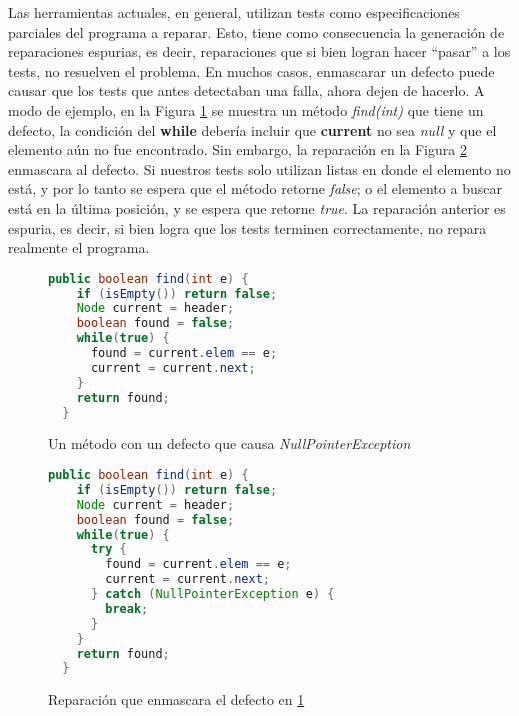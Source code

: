 Las herramientas actuales, en general, utilizan tests como especificaciones parciales del programa a reparar. Esto, tiene como consecuencia la generaci\'on de reparaciones espurias, es decir, reparaciones que si bien logran hacer ``pasar'' a los tests, no resuelven el problema. En muchos casos, enmascarar un defecto puede causar que los tests que antes detectaban una falla, ahora dejen de hacerlo. A modo de ejemplo, en la Figura \ref{figures.examples.repair.nullaccessexample} se muestra un m\'etodo \emph{find(int)} que tiene un defecto, la condici\'on del \textbf{while} deber\'ia incluir que \textbf{current} no sea \emph{null} y que el elemento a\'un no fue encontrado. Sin embargo, la reparaci\'on en la Figura \ref{figures.examples.repair.nullaccessexample.mask} enmascara al defecto. Si nuestros tests solo utilizan listas en donde el elemento no est\'a, y por lo tanto se espera que el m\'etodo retorne \emph{false}; o el elemento a buscar est\'a en la \'ultima posici\'on, y se espera que retorne \emph{true}. La reparaci\'on anterior es espuria, es decir, si bien logra que los tests terminen correctamente, no repara realmente el programa.

\begin{figure}
	\begin{lstlisting}[mathescape=true, language=Java]
  public boolean find(int e) {
    if (isEmpty()) return false;
    Node current = header;
    boolean found = false;
    while(true) {
      found = current.elem == e;
      current = current.next;
    }
    return found;
  }
	\end{lstlisting}
	\caption{Un m\'etodo con un defecto que causa \emph{NullPointerException}}
	\label{figures.examples.repair.nullaccessexample}
\end{figure}

\begin{figure}
	\begin{lstlisting}[mathescape=true, language=Java]
  public boolean find(int e) {
    if (isEmpty()) return false;
    Node current = header;
    boolean found = false;
    while(true) {
      try {
        found = current.elem == e;
        current = current.next;
      } catch (NullPointerException e) {
        break;
      }
    }
    return found;
  }
	\end{lstlisting}
	\caption{Reparaci\'on que enmascara el defecto en \ref{figures.examples.repair.nullaccessexample}}
	\label{figures.examples.repair.nullaccessexample.mask}
\end{figure}

